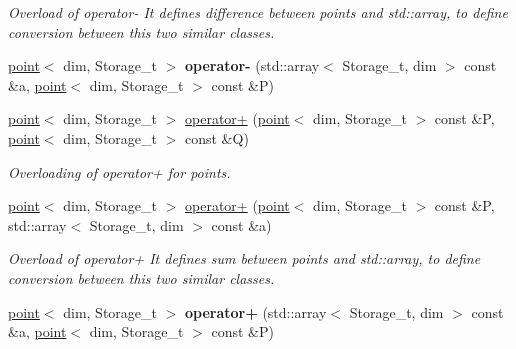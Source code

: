 \begin{DoxyCompactItemize}
\begin{DoxyCompactList}\small\item\em Overload of operator-\/  It defines difference between points and std::array, to define conversion between this two similar classes. \item\end{DoxyCompactList}\item 
\hypertarget{classBGLgeom_1_1point_a90c06fe85084976dafed8f7327475168}{
\hyperlink{classBGLgeom_1_1point}{point}$<$ dim, Storage\_\-t $>$ {\bfseries operator-\/} (std::array$<$ Storage\_\-t, dim $>$ const \&a, \hyperlink{classBGLgeom_1_1point}{point}$<$ dim, Storage\_\-t $>$ const \&P)}
\label{classBGLgeom_1_1point_a90c06fe85084976dafed8f7327475168}

\item 
\hypertarget{classBGLgeom_1_1point_ac53bdc3ab7147d4b1209b126a6297693}{
\hyperlink{classBGLgeom_1_1point}{point}$<$ dim, Storage\_\-t $>$ \hyperlink{classBGLgeom_1_1point_ac53bdc3ab7147d4b1209b126a6297693}{operator+} (\hyperlink{classBGLgeom_1_1point}{point}$<$ dim, Storage\_\-t $>$ const \&P, \hyperlink{classBGLgeom_1_1point}{point}$<$ dim, Storage\_\-t $>$ const \&Q)}
\label{classBGLgeom_1_1point_ac53bdc3ab7147d4b1209b126a6297693}

\begin{DoxyCompactList}\small\item\em Overloading of operator+ for points. \item\end{DoxyCompactList}\item 
\hypertarget{classBGLgeom_1_1point_a5c3289000c0186ffe3e0166fd33ebc72}{
\hyperlink{classBGLgeom_1_1point}{point}$<$ dim, Storage\_\-t $>$ \hyperlink{classBGLgeom_1_1point_a5c3289000c0186ffe3e0166fd33ebc72}{operator+} (\hyperlink{classBGLgeom_1_1point}{point}$<$ dim, Storage\_\-t $>$ const \&P, std::array$<$ Storage\_\-t, dim $>$ const \&a)}
\label{classBGLgeom_1_1point_a5c3289000c0186ffe3e0166fd33ebc72}

\begin{DoxyCompactList}\small\item\em Overload of operator+  It defines sum between points and std::array, to define conversion between this two similar classes. \item\end{DoxyCompactList}\item 
\hypertarget{classBGLgeom_1_1point_aa752d465b9fb5023cb3fa45748084da3}{
\hyperlink{classBGLgeom_1_1point}{point}$<$ dim, Storage\_\-t $>$ {\bfseries operator+} (std::array$<$ Storage\_\-t, dim $>$ const \&a, \hyperlink{classBGLgeom_1_1point}{point}$<$ dim, Storage\_\-t $>$ const \&P)}
\label{classBGLgeom_1_1point_aa752d465b9fb5023cb3fa45748084da3}


\end{DoxyCompactItemize}
